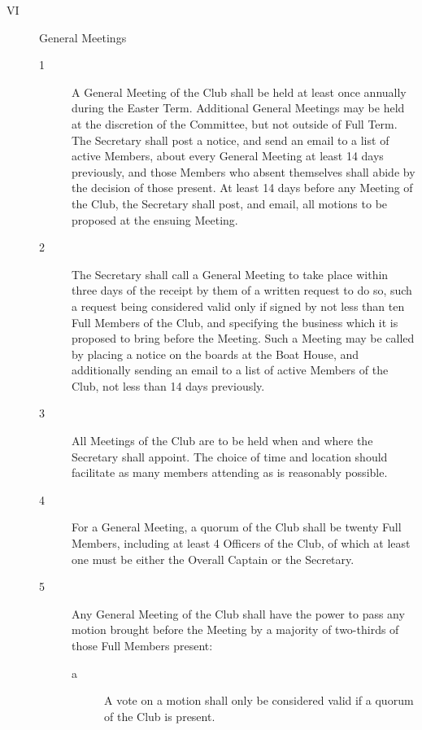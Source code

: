 \documentclass{article}
\begin{document}
\begin{description}
	\item[VI] General Meetings
	\begin{description}
		\item[1] A General Meeting of the Club shall be held at least once annually during the
		Easter Term. Additional General Meetings may be held at the discretion of the
		Committee, but not outside of Full Term. The Secretary shall post a notice,
		and send an email to a list of active Members, about every General Meeting at
		least 14 days previously, and those Members who absent themselves shall
		abide by the decision of those present. At least 14 days before any Meeting of
		the Club, the Secretary shall post, and email, all motions to be proposed at the
		ensuing Meeting.\\
		
		\item[2] The Secretary shall call a General Meeting to take place within three days of
		the receipt by them of a written request to do so, such a request being
		considered valid only if signed by not less than ten Full Members of the Club,
		and specifying the business which it is proposed to bring before the Meeting.
		Such a Meeting may be called by placing a notice on the boards at the Boat
		House, and additionally sending an email to a list of active Members of the
		Club, not less than 14 days previously.\\
		
		\item[3] All Meetings of the Club are to be held when and where the Secretary shall
		appoint. The choice of time and location should facilitate as many members
		attending as is reasonably possible.\\
		
		\item[4] For a General Meeting, a quorum of the Club shall be twenty Full Members,
		including at least 4 Officers of the Club, of which at least one must be either
		the Overall Captain or the Secretary.\\
		
		\item[5] Any General Meeting of the Club shall have the power to pass any motion
		brought before the Meeting by a majority of two-thirds of those Full Members
		present:
		\begin{description}
			\item[a] A vote on a motion shall only be considered valid if a quorum of the
			Club is present.\\
			

\end{description}
\end{description}
\end{description}
\end{document}
